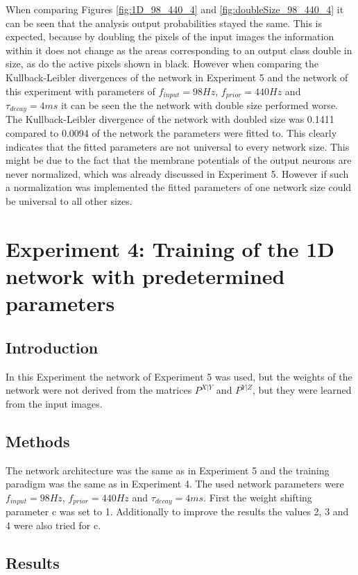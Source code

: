 When comparing Figures \ref{fig:1D_98_440_4} and \ref{fig:doubleSize_98_440_4} it can be seen that the analysis output probabilities stayed the same. This is expected, because by doubling the pixels of the input images the information within it does not change as the areas corresponding to an output class double in size, as do the active pixels shown in black. However when comparing the Kullback-Leibler divergences of the network in Experiment 5 and the network of this experiment with parameters of $f_{input} = 98 Hz$, $f_{prior} = 440 Hz$ and $\tau_{decay} = 4 ms$ it can be seen the the network with double size performed worse. The Kullback-Leibler divergence of the network with doubled size was 0.1411 compared to 0.0094 of the network the parameters were fitted to. This clearly indicates that the fitted parameters are not universal to every network size. This might be due to the fact that the membrane potentials of the output neurons are never normalized, which was already discussed in Experiment 5. However if such a normalization was implemented the fitted parameters of one network size could be universal to all other sizes.

\section{Experiment 4: Training of the 1D network with predetermined parameters}
\label{section:1DPreDetermined}

\subsection{Introduction}

In this Experiment the network of Experiment 5 was used, but the weights of the network were not derived from the matrices $P^{X|Y}$ and $P^{Y|Z}$, but they were learned from the input images.

\subsection{Methods}

The network architecture was the same as in Experiment 5 and the training paradigm was the same as in Experiment 4. The used network parameters were $f_{input} = 98 Hz$, $f_{prior} = 440 Hz$ and $\tau_{decay} = 4 ms$. First the weight shifting parameter c was set to 1. Additionally to improve the results the values 2, 3 and 4 were also tried for c.

\subsection{Results}

